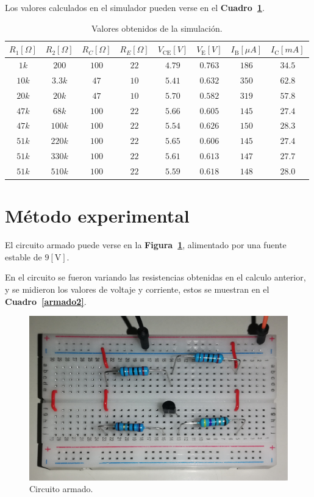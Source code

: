 \documentclass[letter,twoside,11pt]{article}
\begin{document}
Los valores calculados en el simulador pueden verse en el
\textbf{Cuadro~\ref{simulacion2}}.

\begin{table}[!h]
\begin{center}
    \begin{tabular}{|c|c|c|c||c|c|c|c|}
    \hline
    $R_1[\Omega]$ & $R_2[\Omega]$ & $R_C[\Omega]$ & $R_E[\Omega]$ &
    $V_{\text{CE}}[V]$ & $V_{\text{E}}[V]$ &
    $I_{\text{B}}[\mu{A}]$ & $I_{\text{C}}[mA]$
    \tabularnewline \hline
    $ 1k$ & $ 200$ & $100$ & $22$ & $4.79$ & $0.763$ & $186$ & $34.5$ \tabularnewline \hline
    $10k$ & $3.3k$ & $ 47$ & $10$ & $5.41$ & $0.632$ & $350$ & $62.8$ \tabularnewline \hline
    $20k$ & $ 20k$ & $ 47$ & $10$ & $5.70$ & $0.582$ & $319$ & $57.8$ \tabularnewline \hline
    $47k$ & $ 68k$ & $100$ & $22$ & $5.66$ & $0.605$ & $145$ & $27.4$ \tabularnewline \hline
    $47k$ & $100k$ & $100$ & $22$ & $5.54$ & $0.626$ & $150$ & $28.3$ \tabularnewline \hline
    $51k$ & $220k$ & $100$ & $22$ & $5.65$ & $0.606$ & $145$ & $27.4$ \tabularnewline \hline
    $51k$ & $330k$ & $100$ & $22$ & $5.61$ & $0.613$ & $147$ & $27.7$ \tabularnewline \hline
    $51k$ & $510k$ & $100$ & $22$ & $5.59$ & $0.618$ & $148$ & $28.0$ \tabularnewline \hline
    \end{tabular}
\end{center}
\caption{Valores obtenidos de la simulación.}
\label{simulacion2}
\end{table}

\section{Método experimental}
El circuito armado puede verse en la \textbf{Figura~\ref{armado1}}, alimentado
por una fuente estable de $9[\text{V}]$.

En el circuito se fueron variando las resistencias obtenidas en el calculo
anterior, y se midieron los valores de voltaje y corriente, estos se muestran
en el \textbf{Cuadro~\ref{armado2}}.

\begin{figure}[!h]
\centering
\includegraphics[scale=0.12]{fotos/circuito1.eps}
\caption{Circuito armado.}
\label{armado1}
\end{figure}
\end{document}
